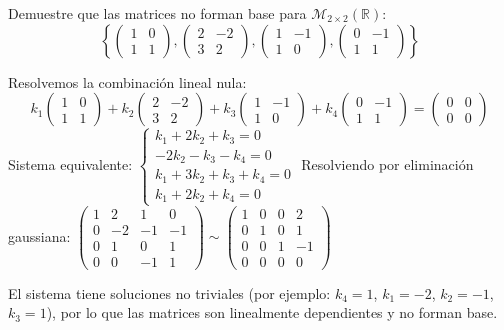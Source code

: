 \begin{example}
Demuestre que las matrices no forman base para $\mathcal{M}_{2\times 2}(\mathbb{R})$:
$$\left\{\begin{pmatrix} 1&0\\1&1\end{pmatrix}, \begin{pmatrix} 2&-2\\3&2\end{pmatrix}, \begin{pmatrix} 1&-1\\1&0\end{pmatrix},\begin{pmatrix} 0&-1\\1&1\end{pmatrix}\right\}$$
\begin{myproof}
Resolvemos la combinación lineal nula:
$$k_1\begin{pmatrix} 1&0\\1&1\end{pmatrix} + k_2\begin{pmatrix} 2&-2\\3&2\end{pmatrix} + k_3\begin{pmatrix} 1&-1\\1&0\end{pmatrix} + k_4\begin{pmatrix} 0&-1\\1&1\end{pmatrix} = \begin{pmatrix} 0&0\\0&0\end{pmatrix}$$
Sistema equivalente: $\begin{cases} 
k_1 + 2k_2 + k_3 = 0 \\
-2k_2 - k_3 - k_4 = 0 \\
k_1 + 3k_2 + k_3 + k_4 = 0 \\
k_1 + 2k_2 + k_4 = 0 
\end{cases}$
Resolviendo por eliminación gaussiana: $\begin{pmatrix}
1 & 2 & 1 & 0 \\
0 & -2 & -1 & -1 \\
0 & 1 & 0 & 1 \\
0 & 0 & -1 & 1 
\end{pmatrix} \sim \begin{pmatrix}
1 & 0 & 0 & 2 \\
0 & 1 & 0 & 1 \\
0 & 0 & 1 & -1 \\
0 & 0 & 0 & 0 
\end{pmatrix}$


El sistema tiene soluciones no triviales (por ejemplo: $k_4 = 1$, $k_1 = -2$, $k_2 = -1$, $k_3 = 1$), por lo que las matrices son linealmente dependientes y no forman base.
\end{myproof}
\end{example}

